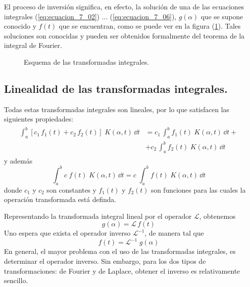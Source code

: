 \par
El proceso de inversión significa, en efecto, la solución de una de las ecuaciones integrales (\ref{eq:ecuacion_7_02}) $\ldots$ (\ref{eq:ecuacion_7_06}), $g (\alpha)$ que se supone conocido y $f(t)$ que se encuentran, como se puede ver en la figura (\ref{fig:figura_01}). Tales soluciones son conocidas y pueden ser obtenidos formalmente del teorema de la integral de Fourier.
\begin{figure}[H]
\centering

\caption{Esquema de las transformadas integrales.}
\label{fig:figura_01}
\end{figure}
\subsection{Linealidad de las transformadas integrales.}
Todas estas transformadas integrales son lineales, por lo que satisfacen las siguientes propiedades:
\begin{align}
\begin{aligned}
\int_{a}^{b} [ c_{1} \, f_{1} (t) + c_{2} \, f_{2}(t)] \; K(\alpha, t) \, \dd{t} &= c_{1} \, \int_{a}^{b} f_{1} (t) \; K(\alpha, t) \, \dd{t} + \\
&+ c_{2} \, \int_{a}^{b} f_{2} (t) \; K(\alpha, t) \, \dd{t}
\end{aligned}
\label{eq:ecuacion_15_08} 
\end{align}
y además
\begin{equation}
\int_{a}^{b}  c \; f (t) \; K(\alpha, t) \, \dd t =  c \; \int_{a}^{b} f (t) \; K(\alpha, t) \, \dd{t}
\label{eq:ecuacion_15_09}
\end{equation}
donde $c_{1}$ y $c_{2}$ son constantes y $f_{1}(t)$ y $f_{2}(t)$ son funciones para las cuales la operación transformada está definda.
\par
Representando la transformada integral lineal por el operador $\mathcal{L}$, obtenemos
\begin{equation}
g (\alpha) = \mathcal{L} \, f(t)
\label{eq:ecuacion_15_10}
\end{equation}
Uno espera que exista el operador inverso $\mathcal{L}^{-1}$, de manera tal que
\begin{equation}
f(t) = \mathcal{L}^{-1}  \; g (\alpha)
\label{eq:ecuacion_15_11}
\end{equation}
En general, el mayor problema con el uso de las transformadas integrales, es determinar el operador inverso. Sin embargo, para los dos tipos de transformaciones: de Fourier y de Laplace, obtener el inverso es relativamente sencillo.
